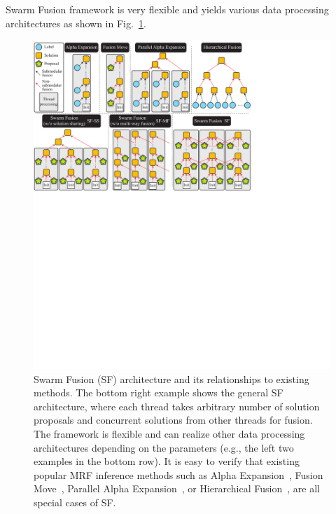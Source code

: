Swarm Fusion framework is very flexible and yields various data
processing architectures as shown in Fig.~\ref{fig:model}.
%
\begin{figure}[tb]
 \includegraphics[width=\columnwidth]{figure/model.pdf} \caption{Swarm
   Fusion (SF) architecture and its relationships to existing methods. The
 bottom right example shows the general SF architecture, where
 each thread takes arbitrary number of solution proposals and concurrent
 solutions from other threads for fusion. The framework is flexible and
 can realize other data processing architectures depending on the
 parameters (e.g., the left two examples in the bottom row).
 It is easy to verify that existing popular MRF inference methods such
 as Alpha Expansion~\cite{alpha_expansion}, Fusion Move~\cite{fusion_moves_for_markov_random_field_optimization},
 Parallel Alpha Expansion~\cite{olga_hierarchical_alpha_expansion}, or Hierarchical
 Fusion~\cite{delong_hierarchical_fusion}, are all special cases of
 SF.}
\label{fig:model}
\end{figure}
